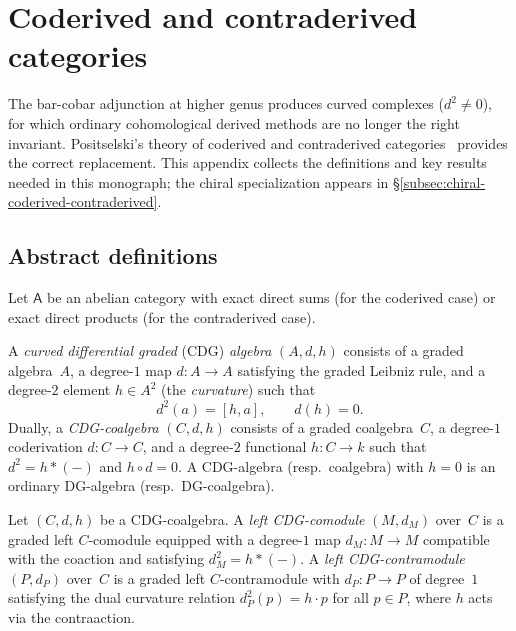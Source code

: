 
\section{Coderived and contraderived categories}
\label{app:coderived}

The bar-cobar adjunction at higher genus produces curved complexes
($d^2 \neq 0$), for which ordinary cohomological derived methods
are no longer the right invariant.
Positselski's theory of coderived and contraderived
categories~\cite{Positselski11} provides the correct
replacement. This appendix collects the definitions and key results
needed in this monograph; the chiral specialization appears in
\S\ref{subsec:chiral-coderived-contraderived}.

\subsection{Abstract definitions}
\label{subsec:coderived-abstract}

Let $\mathsf{A}$ be an abelian category with exact direct sums
(for the coderived case) or exact direct products
(for the contraderived case).

\begin{definition}
\label{def:cdg-algebra-appendix}
A \emph{curved differential graded} (CDG) \emph{algebra}
$(A, d, h)$ consists of a graded algebra~$A$, a degree-$1$
map $d \colon A \to A$ satisfying the graded Leibniz rule, and
a degree-$2$ element $h \in A^2$ (the \emph{curvature}) such that
\begin{equation}\label{eq:cdg-relations-appendix}
d^2(a) = [h, a], \qquad d(h) = 0.
\end{equation}
Dually, a \emph{CDG-coalgebra} $(C, d, h)$ consists of a graded
coalgebra~$C$, a degree-$1$ coderivation $d \colon C \to C$,
and a degree-$2$ functional $h \colon C \to k$ such that
$d^2 = h \ast (-)$ and $h \circ d = 0$.
A CDG-algebra (resp.\ coalgebra) with $h = 0$ is an ordinary
DG-algebra (resp.\ DG-coalgebra).
\end{definition}

\begin{definition}
\label{def:cdg-comod-contra-appendix}
Let $(C, d, h)$ be a CDG-coalgebra.
A \emph{left CDG-comodule} $(M, d_M)$ over~$C$ is a graded left
$C$-comodule equipped with a degree-$1$ map $d_M \colon M \to M$
compatible with the coaction and satisfying $d_M^2 = h \ast (-)$.
A \emph{left CDG-contramodule} $(P, d_P)$ over~$C$ is a graded left
$C$-contramodule with $d_P \colon P \to P$ of degree~$1$ satisfying
the dual curvature relation $d_P^2(p) = h \cdot p$
for all $p \in P$, where $h$ acts via the contraaction.
\end{definition}

